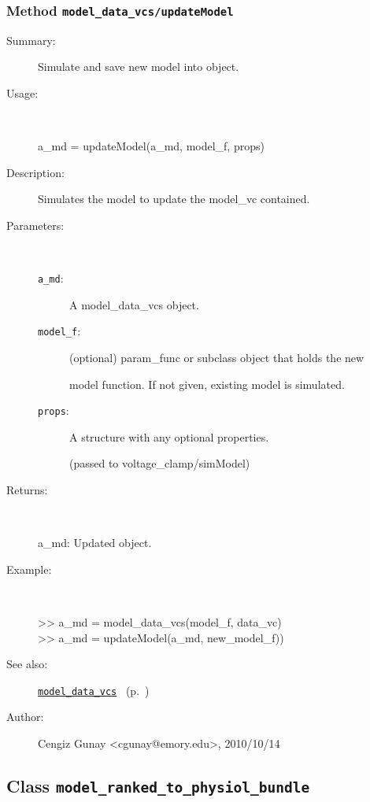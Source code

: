 \subsubsection[Method \texttt{updateModel}]{Method \texttt{model\_data\_vcs/updateModel}}%
%
\label{ref_model_data_vcs__updateModel}%
\hypertarget{ref_model_data_vcs__updateModel}{}%
\begin{description}
\item[Summary:]Simulate and save new model into object.
%
\item[Usage:]~%
\begin{lyxcode}%
a\_md = updateModel(a\_md, model\_f, props)
%
\end{lyxcode}%
%
\item[Description:]%
Simulates the model to update the model\_vc contained.
\item[Parameters:]~
\begin{description}%
\item[\texttt{a\_md}:]
 A model\_data\_vcs object.
\item[\texttt{model\_f}:]
 (optional) param\_func or subclass object that holds the new

model function. If not given, existing model is simulated.
\item[\texttt{props}:]
 A structure with any optional properties.

(passed to voltage\_clamp/simModel)
\end{description}%
%
\item[Returns:
]~

   a\_md: Updated object.
%
\item[Example:]~
\begin{lyxcode} >> a\_md = model\_data\_vcs(model\_f, data\_vc)
\\%
 >> a\_md = updateModel(a\_md, new\_model\_f))
\\%
\end{lyxcode}
%
\item[See also:]%
\hyperlink{ref_model_data_vcs}{\texttt{model\_data\_vcs}}%
\ (p.~\pageref{ref_model_data_vcs})%
%
%
\item[Author:]%
Cengiz Gunay <cgunay@emory.edu>, 2010/10/14
%
\end{description}
\methodline%
\subsection{Class \texttt{model\_ranked\_to\_physiol\_bundle}}%
%
\label{ref_model_ranked_to_physiol_bundle}%
\hypertarget{ref_model_ranked_to_physiol_bundle}{}%
